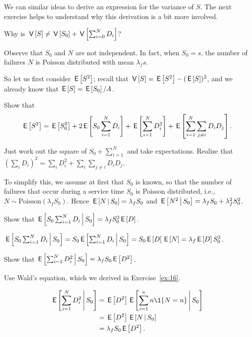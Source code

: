 We can similar ideas to derive an expression for the variance of $S$. The next exercise helps to  understand why this derivation is a bit more involved.
\begin{exercise}
  Why is $\,\mathsf{V}\left[S\right] \neq \,\mathsf{V}\left[S_0\right] + \,\mathsf{V}\left[\sum_{i=0}^N D_i\right]$?
  \begin{solution}
    Observe that $S_0$ and $N$ are not independent. In fact, when $S_0=s$, the number of failures $N$ is Poisson distributed with mean $\lambda_f s$. 
  \end{solution}
\end{exercise}

So let us first consider $\,\mathsf{E}\left[S^2\right]$; recall that $\,\mathsf{V}\left[S\right] = \,\mathsf{E}\left[S^2\right] - (\,\mathsf{E}\left[S\right])^2$, and we already know that $\,\mathsf{E}\left[S\right] = \,\mathsf{E}\left[S_0\right]/A$. 

\begin{exercise}
Show that 
\begin{equation*}
  \,\mathsf{E}\left[S^2\right] = \,\mathsf{E}\left[S_0^2\right] + 2\,\mathsf{E}\left[S_0 \sum_{i=1}^N D_i\right] + \,\mathsf{E}\left[\sum_{i=1}^N D_i^2\right] + \,\mathsf{E}\left[\sum_{i=1}^N \sum_{j\neq i} D_i D_j\right].
\end{equation*}
\begin{solution}
  Just work out the square of $S_0+\sum_{i=1}^N$ and take expectations. Realize that $(\sum_i D_i)^2 = \sum_i D_i^2 + \sum_i\sum_{j\neq i} D_i D_j$.  
\end{solution}
\end{exercise}

To simplify this, we  assume at first that $S_0$ is known, so that the number of failures that occur during a service time $S_0$ is Poisson distributed, i.e.,  $N\sim \text{Poisson}(\lambda_f S_0)$.  Hence $\,\mathsf{E}\left[N\,\middle|\, S_0\right] = \lambda_f S_0$ and $\,\mathsf{E}\left[N^2\,\middle|\, S_0\right]= \lambda_f S_0 + \lambda_f^2 S_0^2$. 

\begin{exercise}
  Show that $\,\mathsf{E}\left[S_0 \sum_{i=1}^N D_i\,\middle|\, S_0\right] = \lambda_f S_0^2 \,\mathsf{E}\left[D\right]$.
\begin{solution}
$\,\mathsf{E}\left[S_0 \sum_{i=1}^N D_i\,\middle|\, S_0\right] = 
S_0 \,\mathsf{E}\left[\sum_{i=1}^N D_i\,\middle|\, S_0\right] = S_0 \,\mathsf{E}\left[D\right] \,\mathsf{E}\left[N\right] = \lambda_f \,\mathsf{E}\left[D\right] S_0^2$.
\end{solution}
\end{exercise}

\begin{exercise}
Show that $\,\mathsf{E}\left[\sum_{i=1}^N D_i^2\,\middle|\, S_0\right] = \lambda_f S_0 \,\mathsf{E}\left[D^2\right]$.
\begin{hint}
  Use Wald's equation, which we derived in Exercise~\ref{ex:16}.
\end{hint}
\begin{solution}
  \begin{align*}
    \E{\sum_{i=1}^N D_i^2\given S_0} 
&= \E{D^2}\E{ \sum_{i=1}^n n \1{N=n}\given S_0}\\
&= \E{D^2} \E{N\given S_0} \\
&= \lambda_f S_0 \E{D^2}.
  \end{align*}
\end{solution}
\end{exercise}

